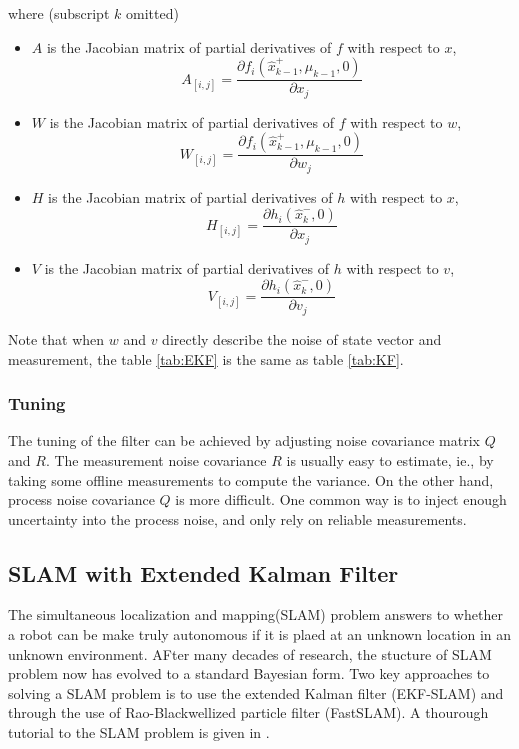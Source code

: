 \noindent where (subscript $k$ omitted)
\begin{itemize}
  \item $A$ is the Jacobian matrix of partial derivatives of $f$ with
  respect to $x$, $$A_{[i,j]}= \frac{\partial f_i(\hat{x}_{k-1}^+, \mu_{k-1},
    0)}{\partial x_j}$$
  \item $W$ is the Jacobian matrix of partial derivatives of $f$ with
  respect to $w$, $$W_{[i,j]}= \frac{\partial f_i(\hat{x}_{k-1}^+, \mu_{k-1},
    0)}{\partial w_j}$$
  \item $H$ is the Jacobian matrix of partial derivatives of $h$ with
  respect to $x$, $$H_{[i,j]}= \frac{\partial h_i(\hat{x}_k^-, 0)}{\partial x_j}$$
  \item $V$ is the Jacobian matrix of partial derivatives of $h$ with
  respect to $v$, $$V_{[i,j]}= \frac{\partial h_i(\hat{x}_k^-,0)}{\partial v_j}$$
\end{itemize}

\noindent Note that when $w$ and $v$ directly describe the noise of
state vector and measurement, the table \ref{tab:EKF} is the same as
table \ref{tab:KF}. 

\subsubsection{Tuning}

The tuning of the filter can be achieved by adjusting noise covariance
matrix $Q$ and $R$. The measurement noise covariance $R$ is usually
easy to estimate, ie., by taking some offline measurements to compute
the variance. On the other hand, process noise covariance $Q$ is more
difficult. One common way is to inject enough uncertainty into the
process noise, and only rely on reliable measurements. 
 
\subsection{SLAM with Extended Kalman Filter}

The simultaneous localization and mapping(SLAM) problem answers to
whether a robot can be make truly autonomous if it is plaed at an
unknown location in an unknown environment. AFter many decades of
research, the stucture of SLAM problem now has evolved to a standard
Bayesian form. Two key approaches to solving a SLAM problem is to use
the extended Kalman filter (EKF-SLAM) and through the use of
Rao-Blackwellized particle filter (FastSLAM). A thourough tutorial to
the SLAM problem is given in \cite{durrant-whyte_simultaneous_2006}
\cite{bailey_simultaneous_2006}.

